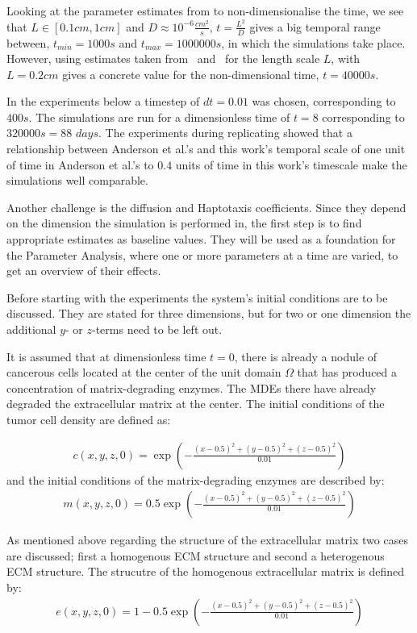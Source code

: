 Looking at the parameter estimates from \cite{anderson_mathematical_2000} to non-dimensionalise the time, we see that $L \in [0.1cm,1cm]$ and $D\approx 10^{-6}\frac{cm^2}{s}$, $t = \frac{L^2}{D}$ gives a big temporal range between, $t_{min} = 1000s$ and $t_{max} = 1000000s$, in which the simulations take place. However, using estimates taken from~\cite{STEPHANOU200696} and~\cite{franssen_mathematical_2019} for the length scale $L$, with $L=0.2cm$ gives a concrete value for the non-dimensional time, $t=40000s$.

In the experiments below a timestep of $dt=0.01$ was chosen, corresponding to $400s$. The simulations are run for a dimensionless time of $t=8$ corresponding to $320000s=88$ $days$. The experiments during replicating  showed that a relationship between Anderson et al.'s and this work's temporal scale of one unit of time in Anderson et al.'s to $0.4$ units of time in this work's timescale make the simulations well comparable.

Another challenge is the diffusion and Haptotaxis coefficients. Since they depend on the dimension the simulation is performed in, the first step is to find appropriate estimates as baseline values. They will be used as a foundation for the Parameter Analysis, where one or more parameters at a time are varied, to get an overview of their effects. 

Before starting with the experiments the system's initial conditions are to be discussed. They are stated for three dimensions, but for two or one dimension the additional $y$- or $z$-terms need to be left out.

It is assumed that at dimensionless time $t=0$, there is already a nodule of cancerous cells located at the center of the unit domain $\Omega$ that has produced a concentration of matrix-degrading enzymes. The MDEs there have already degraded the extracellular matrix at the center. The initial conditions of the tumor cell density are defined as:

\begin{align*}
    c(x,y,z,0)= \exp(-\frac{(x-0.5)^2+(y-0.5)^2+(z-0.5)^2}{0.01})
\end{align*}
and the initial conditions of the matrix-degrading enzymes are described by:
\begin{align*}
    m(x,y,z,0) = 0.5 \exp(-\frac{(x-0.5)^2+(y-0.5)^2+(z-0.5)^2}{0.01})
\end{align*}

As mentioned above regarding the structure of the extracellular matrix two cases are discussed; first a homogenous ECM structure and second a heterogenous ECM structure.
The strucutre of the homogenous extracellular matrix is defined by:
\begin{align*}
    e(x,y,z,0) = 1 - 0.5 \exp(-\frac{(x-0.5)^2+(y-0.5)^2+(z-0.5)^2}{0.01})
\end{align*}

